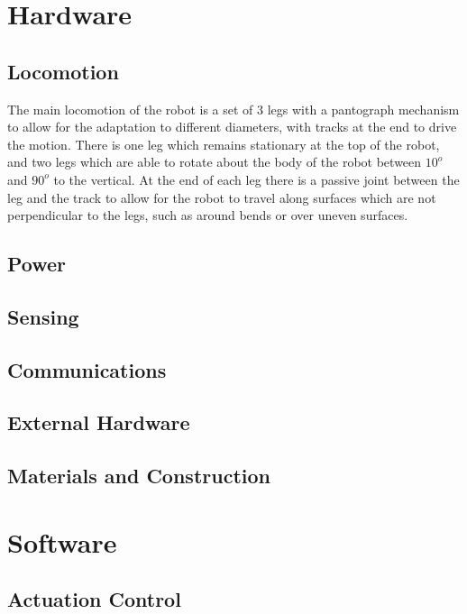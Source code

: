 \documentclass[11pt]{article}		%
\begin{document}
	\section{Hardware}
	
		\subsection{Locomotion}
		
			The main locomotion of the robot is a set of 3 legs with a pantograph mechanism  to allow for the adaptation to different diameters, with tracks at the end to drive the motion.
			There is one leg which remains stationary at the top of the robot, and two legs which are able to rotate about the body of the robot between $10^o$ and $90^o$ to the vertical.
			At the end of each leg there is a passive joint between the leg and the track to allow for the robot to travel along surfaces which are not perpendicular to the legs, such as around bends or over uneven surfaces.
		
		\subsection{Power}
		
		\subsection{Sensing}
		
		\subsection{Communications}
		
		\subsection{External Hardware}
	
		\subsection{Materials and Construction}
	
	\section{Software}
	
		\subsection{Actuation Control}
		
\end{document}
